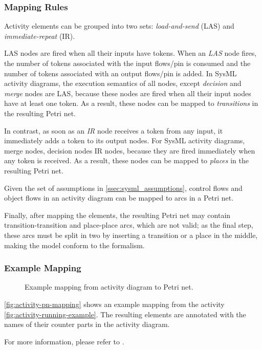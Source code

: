 \subsubsection{Mapping Rules}

Activity elements can be grouped into two sets: \emph{load-and-send} (LAS) and \emph{immediate-repeat} (IR).

LAS nodes are fired when all their inputs have tokens. When an \emph{LAS} node fires, the number of tokens associated with the input flows/pin is consumed and the number of tokens associated with an output flows/pin is added. In SysML activity diagrams, the execution semantics of all nodes, except \emph{decision} and \emph{merge} nodes are LAS, because these nodes are fired when all their input nodes have at least one token. As a result, these nodes can be mapped to \emph{transitions} in the resulting Petri net.

In contrast, as soon as an \emph{IR} node receives a token from any input, it immediately adds a token to its output nodes. For SysML activity diagrams, merge nodes, decision nodes IR nodes, because they are fired immediately when any token is received. As a result, these nodes can be mapped to \emph{places} in the resulting Petri net.

Given the set of assumptions in \autoref{ssec:sysml_assumptions}, control flows and object flows in an activity diagram can be mapped to arcs in a Petri net.

Finally, after mapping the elements, the resulting Petri net may contain transition-transition and place-place arcs, which are not valid; as the final step, these arcs must be split in two by inserting a transition or a place in the middle, making the model conform to the formalism.

\subsubsection{Example Mapping}

\begin{figure}[!ht]
	\centering
	
	\caption{Example mapping from activity diagram to Petri net.}
	\label{fig:activity-pn-mapping}
\end{figure}

\autoref{fig:activity-pn-mapping} shows an example mapping from the activity \autoref{fig:activity-running-example}. The resulting elements are annotated with the names of their counter parts in the activity diagram.

For more information, please refer to \cite{https://doi.org/10.1002/sys.21524}.